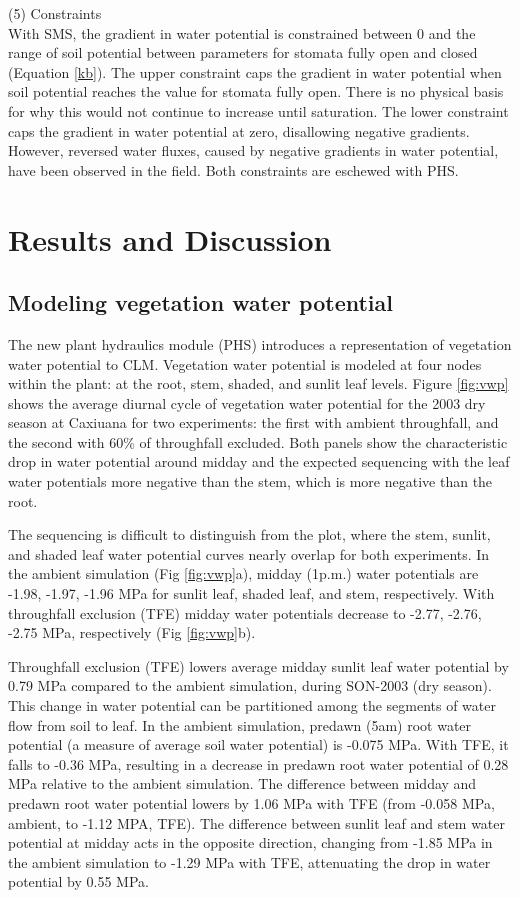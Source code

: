 \documentclass[draft,linenumbers]{agujournal}
\begin{document}
    (5) Constraints \\
    With SMS, the gradient in water potential is constrained between 0 and 
    the range of soil potential between parameters for stomata fully open and closed (Equation \ref{kb}). 
    The upper constraint caps the gradient in water potential when soil potential reaches the value for stomata fully open.
    There is no physical basis for why this would not continue to increase until saturation.
    The lower constraint caps the gradient in water potential at zero, disallowing negative gradients.
    However, reversed water fluxes, caused by negative gradients in water potential, have been observed in the field.
    Both constraints are eschewed with PHS.     
    
\section{Results and Discussion}
\subsection{Modeling vegetation water potential}

The new plant hydraulics module (PHS) introduces a representation of vegetation water potential to CLM.
Vegetation water potential is modeled at four nodes within the plant: at the root, stem, shaded, and sunlit leaf levels.
Figure \ref{fig:vwp} shows the average diurnal cycle of vegetation water potential for the 2003 dry season at Caxiuana for two experiments:
the first with ambient throughfall, and the second with 60\% of throughfall excluded. 
Both panels show the characteristic drop in water potential around midday and the expected sequencing with 
the leaf water potentials more negative than the stem, which is more negative than the root.

The sequencing is difficult to distinguish from the plot, where the stem, sunlit, and shaded leaf water potential curves nearly overlap for both experiments. 
In the ambient simulation (Fig \ref{fig:vwp}a), midday (1p.m.) water potentials are -1.98, -1.97, -1.96 MPa 
for sunlit leaf, shaded leaf, and stem, respectively.
With throughfall exclusion (TFE)  midday water potentials decrease to -2.77, -2.76, -2.75 MPa, respectively (Fig \ref{fig:vwp}b).

Throughfall exclusion (TFE) lowers average midday sunlit leaf water potential by 0.79 MPa compared to the ambient simulation, during SON-2003 (dry season).
This change in water potential can be partitioned among the segments of water flow from soil to leaf.
In the ambient simulation, predawn (5am) root water potential (a measure of average soil water potential) is -0.075 MPa. 
With TFE, it falls to -0.36 MPa, resulting in a decrease in predawn root water potential of 0.28 MPa relative to the ambient simulation. 
The difference between midday and predawn root water potential lowers by 1.06 MPa with TFE 
(from -0.058 MPa, ambient, to -1.12 MPA, TFE).
The difference between sunlit leaf and stem water potential at midday acts in the opposite direction, changing from
-1.85 MPa in the ambient simulation to -1.29 MPa with TFE, attenuating the drop in water potential by 0.55 MPa.
\end{document}
